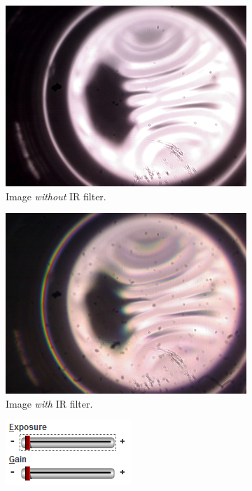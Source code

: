 \documentclass[a4paper, 12pt]{paper}
\begin{document}
\begin{figure}[H]
    \centering
    \begin{subfigure}[p]{0.40\textwidth}
        \includegraphics[width=\textwidth]{img/halogen_without_IR_filter.jpg}
        \caption{Image \emph{without} IR filter.}
    \end{subfigure}
    \begin{subfigure}[p]{0.40\textwidth}
        \includegraphics[width=\textwidth]{img/halogen_with_IR_filter.jpg}
        \caption{Image \emph{with} IR filter.}
    \end{subfigure}
    \begin{subfigure}[p]{0.40\textwidth}
        \includegraphics[width=\textwidth]{img/no_IR_filter}

\end{subfigure}
\end{figure}
\end{document}
